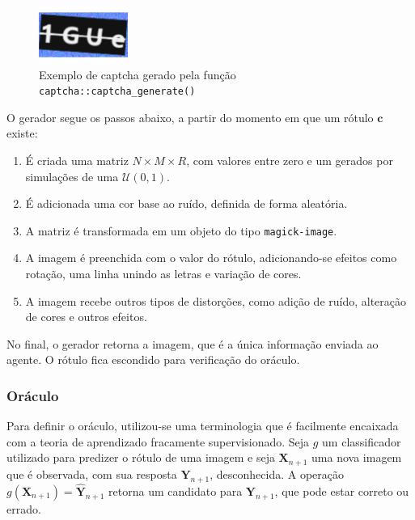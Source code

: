\documentclass[12pt,twoside,brazilian]{book}
\providecommand{\tightlist}{%
  \setlength{\itemsep}{0pt}\setlength{\parskip}{0pt}}
\begin{document}
\begin{figure}

{\centering \includegraphics[width=1.14583in,height=\textheight]{./metodologia_files/figure-pdf/fig-captcha-r-exemplo-1.pdf}

}

\caption{\label{fig-captcha-r-exemplo}Exemplo de captcha gerado pela
função \texttt{captcha::captcha\_generate()}}

\end{figure}

O gerador segue os passos abaixo, a partir do momento em que um rótulo
\(\mathbf c\) existe:

\begin{enumerate}
\def\labelenumi{\arabic{enumi}.}
\tightlist
\item
  É criada uma matriz \(N\times M \times R\), com valores entre zero e
  um gerados por simulações de uma \(\mathcal U(0,1)\).
\item
  É adicionada uma cor base ao ruído, definida de forma aleatória.
\item
  A matriz é transformada em um objeto do tipo \texttt{magick-image}.
\item
  A imagem é preenchida com o valor do rótulo, adicionando-se efeitos
  como rotação, uma linha unindo as letras e variação de cores.
\item
  A imagem recebe outros tipos de distorções, como adição de ruído,
  alteração de cores e outros efeitos.
\end{enumerate}

No final, o gerador retorna a imagem, que é a única informação enviada
ao agente. O rótulo fica escondido para verificação do oráculo.

\hypertarget{sec-oraculo}{%
\subsubsection{Oráculo}\label{sec-oraculo}}

Para definir o oráculo, utilizou-se uma terminologia que é facilmente
encaixada com a teoria de aprendizado fracamente supervisionado. Seja
\(g\) um classificador utilizado para predizer o rótulo de uma imagem e
seja \(\mathbf X_{n+1}\) uma nova imagem que é observada, com sua
resposta \(\mathbf Y_{n+1}\), desconhecida. A operação
\(g(\mathbf X_{n+1}) = \hat {\mathbf Y}_{n+1}\) retorna um candidato
para \(\mathbf Y_{n+1}\), que pode estar correto ou errado.
\end{document}
